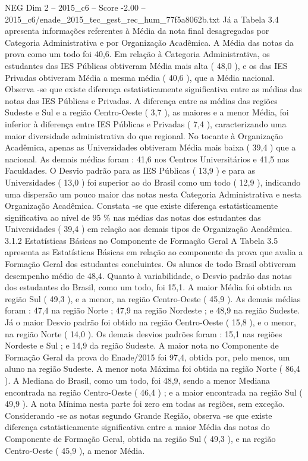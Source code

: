 \begin{textsample}{NEG Dim 2 – 2015\_c6 – Score -2.00 – 2015\_c6/enade\_2015\_tec\_gest\_rec\_hum\_77f5a8062b.txt}
Já a Tabela 3.4 apresenta informações referentes à Média da nota final desagregadas por Categoria Administrativa e por Organização Acadêmica.
A Média das notas da prova como um todo foi 40,6.
Em relação à Categoria Administrativa, os estudantes das IES Públicas obtiveram Média mais alta ( 48,0 ), e os das IES Privadas obtiveram Média a mesma média ( 40,6 ), que a Média nacional.
Observa -se que existe diferença estatisticamente significativa entre as médias das notas das IES Públicas e Privadas.
A diferença entre as médias das regiões Sudeste e Sul e a região Centro-Oeste ( 3,7 ), as maiores e a menor Média, foi inferior à diferença entre IES Públicas e Privadas ( 7,4 ), caracterizando uma maior diversidade administrativa do que regional.
No tocante à Organização Acadêmica, apenas as Universidades obtiveram Média mais baixa ( 39,4 ) que a nacional.
As demais médias foram : 41,6 nos Centros Universitários e 41,5 nas Faculdades.
O Desvio padrão para as IES Públicas ( 13,9 ) e para as Universidades ( 13,0 ) foi superior ao do Brasil como um todo ( 12,9 ), indicando uma dispersão um pouco maior das notas nesta Categoria Administrativa e nesta Organização Acadêmica.
Constata -se que existe diferença estatisticamente significativa ao nível de 95 \% nas médias das notas dos estudantes das Universidades ( 39,4 ) em relação aos demais tipos de Organização Acadêmica. 3.1.2 Estatísticas Básicas no Componente de Formação Geral A Tabela 3.5 apresenta as Estatísticas Básicas em relação ao componente da prova que avalia a Formação Geral dos estudantes concluintes.
Os alunos de todo Brasil obtiveram desempenho médio de 48,4.
Quanto à variabilidade, o Desvio padrão das notas dos estudantes do Brasil, como um todo, foi 15,1.
A maior Média foi obtida na região Sul ( 49,3 ), e a menor, na região Centro-Oeste ( 45,9 ).
As demais médias foram : 47,4 na região Norte ; 47,9 na região Nordeste ; e 48,9 na região Sudeste.
Já o maior Desvio padrão foi obtido na região Centro-Oeste ( 15,8 ), e o menor, na região Norte ( 14,0 ).
Os demais desvios padrões foram : 15,1 nas regiões Nordeste e Sul ; e 14,9 da região Sudeste.
A maior nota no Componente de Formação Geral da prova do Enade/2015 foi 97,4, obtida por, pelo menos, um aluno na região Sudeste.
A menor nota Máxima foi obtida na região Norte ( 86,4 ).
A Mediana do Brasil, como um todo, foi 48,9, sendo a menor Mediana encontrada na região Centro-Oeste ( 46,4 ) ; e a maior encontrada na região Sul ( 49,9 ).
A nota Mínima nesta parte foi zero em todas as regiões, sem exceção.
Considerando -se as notas segundo Grande Região, observa -se que existe diferença estatisticamente significativa entre a maior Média das notas do Componente de Formação Geral, obtida na região Sul ( 49,3 ), e na região Centro-Oeste ( 45,9 ), a menor Média.

\end{textsample}
